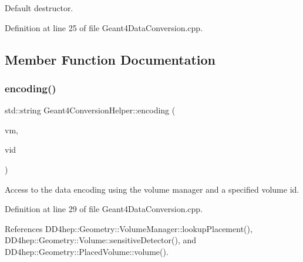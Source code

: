 Default destructor. 



Definition at line 25 of file Geant4\+Data\+Conversion.\+cpp.



\subsection{Member Function Documentation}
\hypertarget{class_d_d4hep_1_1_simulation_1_1_geant4_conversion_helper_a0a26b1a641a6b57ba1d5f92d941e9809}{}\label{class_d_d4hep_1_1_simulation_1_1_geant4_conversion_helper_a0a26b1a641a6b57ba1d5f92d941e9809} 
\subsubsection{\texorpdfstring{encoding()}{encoding()}\hspace{0.1cm}{\footnotesize\ttfamily [1/3]}}
{\footnotesize\ttfamily std\+::string Geant4\+Conversion\+Helper\+::encoding (\begin{DoxyParamCaption}\item[{\hyperlink{class_d_d4hep_1_1_geometry_1_1_volume_manager}{Geometry\+::\+Volume\+Manager}}]{vm,  }\item[{\hyperlink{class_d_d4hep_1_1_geometry_1_1_volume_manager_ab1f746b561c93be38bc7c6e66fc8ca8a}{Geometry\+::\+Volume\+Manager\+::\+Volume\+ID}}]{vid }\end{DoxyParamCaption})\hspace{0.3cm}{\ttfamily [static]}}



Access to the data encoding using the volume manager and a specified volume id. 



Definition at line 29 of file Geant4\+Data\+Conversion.\+cpp.



References D\+D4hep\+::\+Geometry\+::\+Volume\+Manager\+::lookup\+Placement(), D\+D4hep\+::\+Geometry\+::\+Volume\+::sensitive\+Detector(), and D\+D4hep\+::\+Geometry\+::\+Placed\+Volume\+::volume().

\hypertarget{class_d_d4hep_1_1_simulation_1_1_geant4_conversion_helper_a90f912fdcfa4e17d2179e714318b53e4}{}\label{class_d_d4hep_1_1_simulation_1_1_geant4_conversion_helper_a90f912fdcfa4e17d2179e714318b53e4} 
